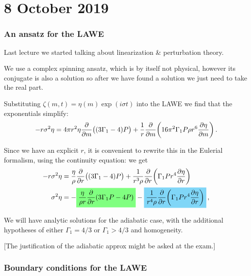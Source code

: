 \documentclass[main.tex]{subfiles}
\begin{document}
\section*{8 October 2019}

\subsubsection{An ansatz for the LAWE}

Last lecture we started talking about linearization \& perturbation theory.

We use a complex spinning ansatz, which is by itself not physical, however its conjugate is also a solution so after we have found a solution we just need to take the real part.

Substituting \(\zeta (m, t) = \eta (m) \exp(i \sigma t)\) into the LAWE we find that the exponentials simplify: 
%
\begin{align}
-r \sigma^2 \eta  =
4 \pi r^2 \eta \pdv{}{m} \qty((3 \Gamma_1 - 4)P)+
\frac{1}{r} \pdv{}{m} \qty(16 \pi^2 \Gamma_1 P \rho r^6 \pdv{\eta }{m} )  
\,.
\end{align}

Since we have an explicit \(r\), it is convenient to rewrite this in the Eulerial formalism, using the continuity equation: we get 
%
\begin{subequations}
\begin{align}
- r \sigma^2 \eta &= 
\frac{\eta }{\rho } \pdv{}{r} \qty((3\Gamma_1 - 4) P)
+ \frac{1}{r^3 \rho } \pdv{}{r} \qty(\Gamma_1 P r^{4} \pdv{\eta }{r})  \\
\sigma^2 \eta  &= - \hlc{green}{\frac{\eta }{\rho r} \pdv{}{r} \qty(3 \Gamma_1 P - 4P )} -\hlc{cyan}{\frac{1}{r^{4} \rho } \pdv{}{r} \qty(\Gamma_1 P r^{4} \pdv{\eta }{r})}
\,, \label{eq:linear-operator-LAWE}
\end{align}
\end{subequations}
%

We will have analytic solutions for the adiabatic case, with the additional hypotheses of either \(\Gamma_1 = 4/3\) or \(\Gamma_1 > 4/3\) and homogeneity.

[The justification of the adiabatic approx might be asked at the exam.]

\subsubsection{Boundary conditions for the LAWE}
\end{document}
